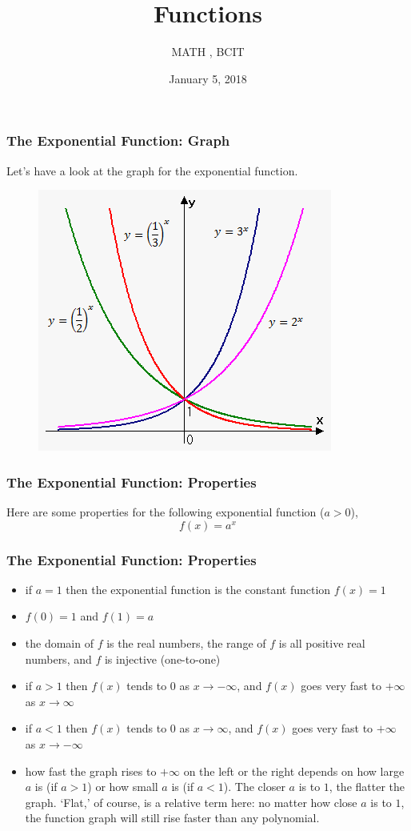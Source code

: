 \documentclass[xcolor=dvipsnames]{beamer}
\title{Functions}
\subtitle{MATH {\CourseNumber}, BCIT}
\author{\CourseName}
\date{January 5, 2018}
\begin{document}
\begin{frame}
  \titlepage
\end{frame}

\begin{frame}
  \frametitle{The Exponential Function: Graph}
Let's have a look at the graph for the exponential function.
  \begin{figure}[h]
    \includegraphics[scale=.6]{./diagrams/1_2_exponential_function.png}
  \end{figure}
\end{frame}

\begin{frame}
  \frametitle{The Exponential Function: Properties}
  Here are some properties for the following exponential function
  ($a>0$),
\begin{equation}
  \label{eq:muwauzie}
  f(x)=a^{x}
\end{equation}
\end{frame}

\begin{frame}
  \frametitle{The Exponential Function: Properties}
\begin{itemize}
\item<1-> if $a=1$ then the exponential function is the constant function $f(x)=1$
\item<2-> $f(0)=1$ and $f(1)=a$
\item<3-> the domain of $f$ is the real numbers, the range of $f$ is
  all positive real numbers, and $f$ is injective (one-to-one)
\item<4-> if $a>1$ then $f(x)$ tends to $0$ as $x\rightarrow -\infty$, and
  $f(x)$ goes very fast to $+\infty$ as $x\rightarrow \infty$
\item<5-> if $a<1$ then $f(x)$ tends to $0$ as $x\rightarrow \infty$, and
  $f(x)$ goes very fast to $+\infty$ as $x\rightarrow -\infty$
\item<6-> how fast the graph rises to $+\infty$ on the left or the
  right depends on how large $a$ is (if $a>1$) or how small
  $a$ is (if $a<1$). The closer $a$ is to $1$, the flatter the graph.
  `Flat,' of course, is a relative term here: no matter how close $a$
  is to $1$, the function graph will still rise faster than any polynomial.
\end{itemize}
\end{frame}
\end{document}
